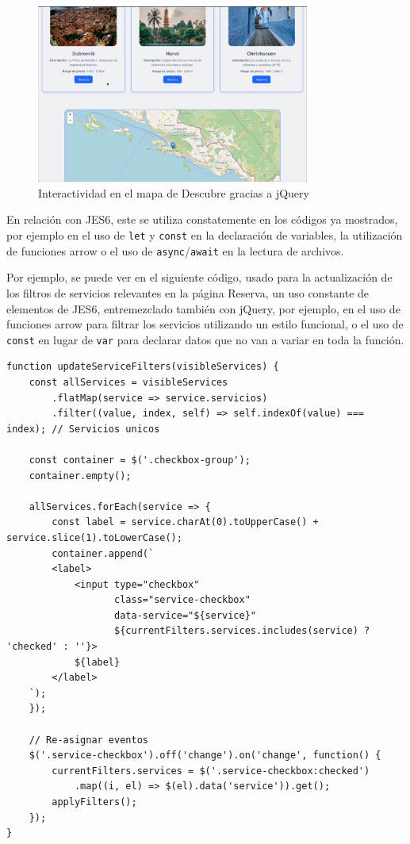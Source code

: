 \documentclass[11pt, a4paper]{book}
\begin{document}
	\begin{figure} [H]
		\centering
        \includegraphics[width=0.8\textwidth]{CSS/4 extra.png}
		\caption{Interactividad en el mapa de Descubre gracias a jQuery}
	\end{figure}

    En relación con JES6, este se utiliza constatemente en los códigos ya mostrados, por ejemplo en el uso de \texttt{let} y \texttt{const} en la declaración de variables, la utilización de funciones arrow o el uso de \texttt{async}/\texttt{await} en la lectura de archivos.

    Por ejemplo, se puede ver en el siguiente código, usado para la actualización de los filtros de servicios relevantes en la página Reserva, un uso constante de elementos de JES6, entremezclado también con jQuery, por ejemplo, en el uso de funciones arrow para filtrar los servicios utilizando un estilo funcional, o el uso de \texttt{const} en lugar de \texttt{var} para declarar datos que no van a variar en toda la función. 

    \begin{lstlisting}
function updateServiceFilters(visibleServices) {
    const allServices = visibleServices
        .flatMap(service => service.servicios)
        .filter((value, index, self) => self.indexOf(value) === index); // Servicios unicos

    const container = $('.checkbox-group');
    container.empty();

    allServices.forEach(service => {
        const label = service.charAt(0).toUpperCase() + service.slice(1).toLowerCase();
        container.append(`
        <label>
            <input type="checkbox" 
                   class="service-checkbox" 
                   data-service="${service}"
                   ${currentFilters.services.includes(service) ? 'checked' : ''}>
            ${label}
        </label>
    `);
    });

    // Re-asignar eventos
    $('.service-checkbox').off('change').on('change', function() {
        currentFilters.services = $('.service-checkbox:checked')
            .map((i, el) => $(el).data('service')).get();
        applyFilters();
    });
}
    \end{lstlisting}
	
\end{document}

